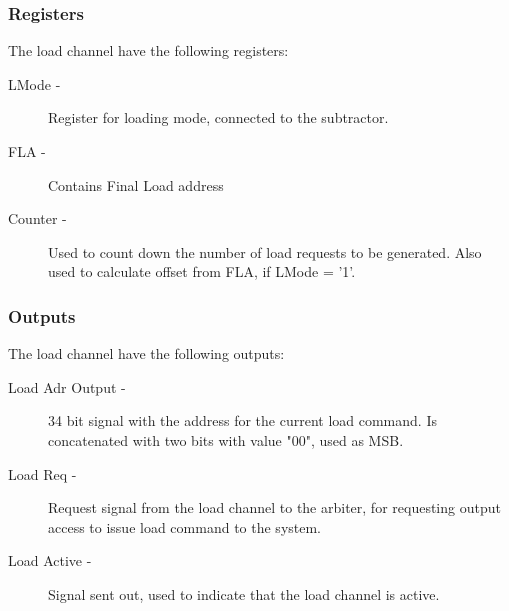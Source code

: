\begin{appendix}
\subsubsection{Registers}
The load channel have the following registers:

\begin{description}
    \item[LMode -]
    Register for loading mode, connected to the subtractor.
    \item[FLA -]
    Contains Final Load address
    \item[Counter -]
    Used to count down the number of load requests to be generated. Also used to calculate offset from FLA, if LMode = '1'.
\end{description}

\subsubsection{Outputs}
The load channel have the following outputs:

\begin{description}
    \item[Load Adr Output -]
    34 bit signal with the address for the current load command. Is concatenated with two bits with value "00", used as MSB.
    \item[Load Req -]
    Request signal from the load channel to the arbiter, for requesting output access to issue load command to the system.   
    \item[Load Active -]
    Signal sent out, used to indicate that the load channel is active.
\end{description}


\end{appendix}
